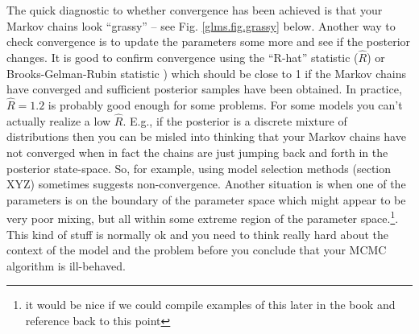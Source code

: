 The quick diagnostic to whether convergence has been achieved is that
your Markov chains look ``grassy'' -- see Fig.  \ref{glms.fig.grassy}
below.  Another way to check
convergence is to update the parameters some more and see if the
posterior changes. It is good to confirm convergence using the
``R-hat'' statistic ($\hat{R}$) or Brooks-Gelman-Rubin statistic
\citep{gelman_etal:1996}) which should be close to 1 if the Markov
chains have converged and sufficient posterior samples have been
obtained. In practice, $\hat{R} = 1.2$ is probably good enough for
some problems.  For some models you can't actually realize a low
$\hat{R}$. E.g., if the posterior is a discrete mixture of distributions
then you can be misled into thinking that your Markov chains
have not converged when in fact the chains are just jumping back and
forth in the posterior state-space. So, for example, using model
selection methods (section XYZ) sometimes suggests non-convergence.
Another situation is when one of the parameters is on the boundary of
the parameter space which might appear to be very poor mixing, but all
within some extreme region of the parameter space.\footnote{it would
  be nice if we could compile examples of this later in the book and
  reference back to this point}.
This
kind of stuff is normally ok and you need to think really hard about
the context of the model and the problem before you conclude that your
MCMC algorithm is ill-behaved.

